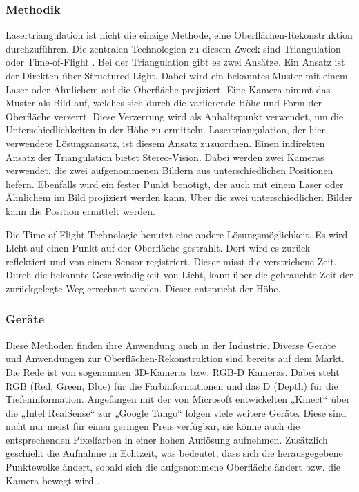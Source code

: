 		\subsubsection{Methodik}
		Lasertriangulation ist nicht die einzige Methode, eine Oberflächen-Rekonstruktion durchzuführen. Die zentralen Technologien zu diesem Zweck sind Triangulation oder Time-of-Flight \citep[Vgl.][]{zollhofer_state_2018}. 
		Bei der Triangulation gibt es zwei Ansätze. Ein Ansatz ist der Direkten über Structured Light. Dabei wird ein bekanntes Muster mit einem Laser oder Ähnlichem auf die Oberfläche projiziert. Eine Kamera nimmt das Muster als Bild auf, welches sich durch die variierende Höhe und Form der Oberfläche verzerrt. Diese Verzerrung wird als Anhaltspunkt verwendet, um die Unterschiedlichkeiten in der Höhe zu ermitteln. Lasertriangulation, der hier verwendete Lösungsansatz, ist diesem Ansatz zuzuordnen. \newline
		Einen indirekten Ansatz der Triangulation bietet Stereo-Vision. Dabei werden zwei Kameras verwendet, die zwei aufgenommenen Bildern aus unterschiedlichen Positionen liefern. Ebenfalls wird ein fester Punkt benötigt, der auch mit einem Laser oder Ähnlichem im Bild projiziert werden kann. Über die zwei unterschiedlichen Bilder kann die Position ermittelt werden.
		
		Die Time-of-Flight-Technologie benutzt eine andere Lösungsmöglichkeit. Es wird Licht auf einen Punkt auf der Oberfläche gestrahlt. Dort wird es zurück reflektiert und von einem Sensor registriert. Dieser misst die verstrichene Zeit. Durch die bekannte Geschwindigkeit von Licht, kann über die gebrauchte Zeit der zurückgelegte Weg errechnet werden. Dieser entspricht der Höhe.
	
		\subsubsection{Geräte}
		Diese Methoden finden ihre Anwendung auch in der Industrie. Diverse Geräte und Anwendungen zur Oberflächen-Rekonstruktion sind bereits auf dem Markt. Die Rede ist von sogenannten 3D-Kameras bzw. RGB-D Kameras. Dabei steht RGB (Red, Green, Blue) für die Farbinformationen und das D (Depth) für die Tiefeninformation. Angefangen mit der von Microsoft entwickelten „Kinect“ über die „Intel RealSense“ zur „Google Tango“ folgen viele weitere Geräte. Diese sind nicht nur meist für einen geringen Preis verfügbar, sie könne auch die entsprechenden Pixelfarben in einer hohen Auflösung aufnehmen.
		Zusätzlich geschieht die Aufnahme in Echtzeit, was bedeutet, dass sich die herausgegebene Punktewolke ändert, sobald sich die aufgenommene Oberfläche ändert bzw. die Kamera bewegt wird \citep[Vgl.][]{zollhofer_state_2018}.
			
